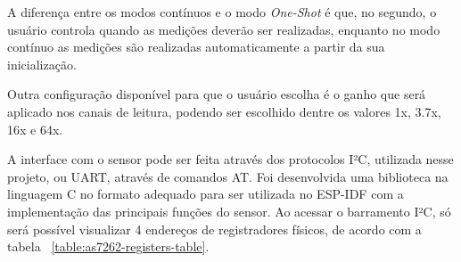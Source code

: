 \documentclass[../monografia.tex]{subfiles}
\begin{document}
A diferença entre os modos contínuos e o modo \textit{One-Shot} é que, no segundo, o usuário controla quando as medições deverão ser realizadas, enquanto no modo contínuo as medições são realizadas automaticamente a partir da sua inicialização.

Outra configuração disponível para que o usuário escolha é o ganho que será aplicado nos canais de leitura, podendo ser escolhido dentre os valores 1x, 3.7x, 16x e 64x.

A interface com o sensor pode ser feita através dos protocolos I²C, utilizada nesse projeto, ou UART, através de comandos AT. Foi desenvolvida uma biblioteca na linguagem C no formato adequado para ser utilizada no ESP-IDF com a implementação das principais funções do sensor. Ao acessar o barramento I²C, só será possível visualizar 4 endereços de registradores físicos, de acordo com a tabela ~\ref{table:as7262-registers-table}.
\end{document}
